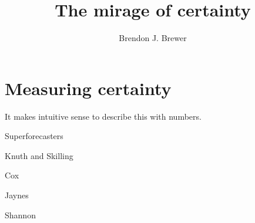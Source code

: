 \documentclass[a4paper, 12pt]{article}
\title{The mirage of certainty}
\author{Brendon J. Brewer}
\begin{document}
\maketitle

\section*{Measuring certainty}

It makes intuitive sense to describe this with numbers.







\begin{thebibliography}{999}
Superforecasters

Knuth and Skilling

Cox

Jaynes

Shannon
\end{thebibliography}
\end{document}
